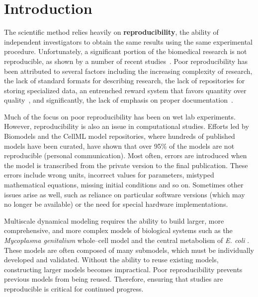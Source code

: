 \documentclass[10pt,letterpaper]{article}
\begin{document}
\linenumbers

\section*{Introduction}



The scientific method relies heavily on {\bf reproducibility}, the ability of independent investigators to obtain the same results using the same experimental procedure.  Unfortunately, a significant portion of the biomedical research is not reproducible, as shown by a number of recent studies~\cite{prinz2011believe,mobley2013survey}.  Poor reproducibility has been attributed to several factors including the increasing complexity of research, the lack of standard formats for describing research, the lack of repositories for storing specialized data, an entrenched reward system that favors quantity over quality~\cite{quan2017publish}, and significantly, the lack of emphasis on proper documentation~\cite{peng2011reproducible}.

Much of the focus on poor reproducibility has been on wet lab experiments. However, reproducibility is also an issue in computational studies.  Efforts led by Biomodels and the CellML model repositories, where hundreds of published models have been curated, have shown that over 95\% of the models are not reproducible (personal communication). Most often, errors are introduced when the model is transcribed from the private version to the final publication.  These errors include wrong units, incorrect values for parameters, mistyped mathematical equations, missing initial conditions and so on. Sometimes other issues arise as well, such as reliance on particular software versions (which may no longer be available) or the need for special hardware implementations.

Multiscale dynamical modeling requires the ability to build larger, more comprehensive, and more complex models of biological systems such as the \textit{Mycoplasma genitalium} whole--cell model \cite{karr2012whole} and the central metabolism of \textit{E. coli} \cite{millard2017metabolic}. These models are often composed of many submodels, which must be individually developed and validated. Without the ability to reuse existing models, constructing larger models becomes impractical. Poor reproducibility prevents previous models from being reused. Therefore, ensuring that studies are reproducible is critical for continued progress.
\end{document}
